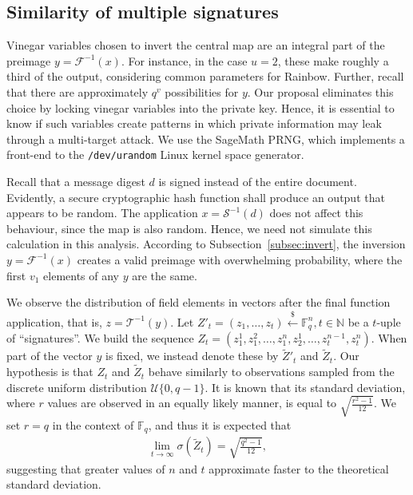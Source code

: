 \documentclass[draft, 12pt, a4paper, oneside]{memoir}
\newcommand{\random}{\stackrel{\$}{\longleftarrow}}
\theoremstyle{definition}
\theoremstyle{remark}
\begin{document}
\subsection{Similarity of multiple signatures}\label{subsec:similar}

Vinegar variables chosen to invert the central map are an integral part of the
preimage $y = \mathcal{F}^{-1}(x)$. For instance, in the case $u = 2$, these
make roughly a third of the output, considering common parameters for Rainbow.
Further, recall that there are approximately $q^v$ possibilities for $y$. Our
proposal eliminates this choice by locking vinegar variables into the private
key. Hence, it is essential to know if such variables create patterns in which
private information may leak through a multi-target attack. We use the SageMath
PRNG, which implements a front-end to the \texttt{/dev/urandom} Linux kernel
space generator.

Recall that a message digest $d$ is signed instead of the entire document.
Evidently, a secure cryptographic hash function shall produce an output that
appears to be random. The application $x = \mathcal{S}^{-1}(d)$ does not affect
this behaviour, since the map is also random. Hence, we need not simulate this
calculation in this analysis. According to Subsection~\ref{subsec:invert}, the
inversion $y = \mathcal{F}^{-1}(x)$ creates a valid preimage with overwhelming
probability, where the first $v_{1}$ elements of any $y$ are the same.

We observe the distribution of field elements in vectors after the final
function application, that is, $z = \mathcal{T}^{-1}(y)$. Let
$Z'_{t} = (z_{1}, \dots, z_{t}) \random{} \mathbb{F}_{q}^{n}, t \in \mathbb{N}$ be
a $t$-uple of ``signatures''. We build the sequence $Z_{t} = (z_{1}^{1},
z_{1}^{2}, \dots, z_{1}^{n}, z_{2}^{1}, \dots, z_{t}^{n - 1}, z_{t}^{n})$.
When part of the vector $y$ is fixed, we instead denote these by
$\widetilde{Z}'_{t}$ and $\widetilde{Z}_{t}$. Our hypothesis is that $Z_{t}$
and $\widetilde{Z}_{t}$ behave similarly to observations sampled from the
discrete uniform distribution $\mathcal{U}\{0, q - 1\}$. It is known that its
standard deviation, where $r$ values are observed in an equally likely manner,
is equal to $\sqrt{\frac{r^{2} - 1}{12}}$. We set $r = q$ in the context of $\mathbb{F}_{q}$, and thus it is expected that
\begin{align}
  \lim_{t \to \infty} \sigma(\widetilde{Z}_{t}) = \sqrt{\frac{q^{2} - 1}{12}},
\end{align}
suggesting that greater values of $n$ and $t$ approximate faster to the
theoretical standard deviation.
\end{document}

